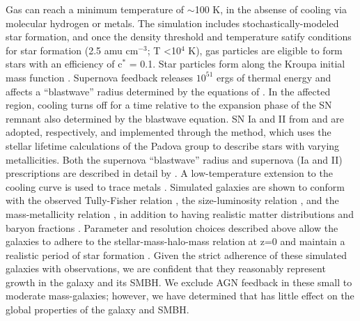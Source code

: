 \documentclass[12pt,headA,chapB]{fiskthesis}
\begin{document}
Gas can reach a minimum temperature of $\sim$100 K, in the absense of cooling via molecular hydrogen or metals. The simulation includes stochastically-modeled star formation, and once the density threshold and temperature satify conditions for star formation (2.5 amu cm$^{-3}$; T 
\textless 10$^4$ K), gas particles are eligible to form stars with an efficiency of c$^*$ = 0.1. Star particles form along the Kroupa initial mass function \citep{Kroupa2001}. Supernova feedback releases $10^{51}$ ergs of thermal energy and affects a ``blastwave'' radius determined by the equations of \cite{Ostriker1988}. In the affected region, cooling turns off for a time relative to the expansion phase of the SN remnant also determined by the blastwave equation. SN Ia and II from \cite{Thielemann1986} and \cite{Woosley1986} are adopted, respectively, and implemented through the \cite{Raiteri1996} method, which uses the stellar lifetime calculations of the Padova group \citep{Alongi1993, Bressan1993, Bertelli1994} to describe stars with varying metallicities. Both the supernova ``blastwave'' radius and supernova (Ia and II) prescriptions are described in detail by \cite{Stinson2006}. A low-temperature extension to the cooling curve is used to trace metals \citep{Bromm2001}. Simulated galaxies are shown to conform with the observed Tully-Fisher relation \citep{Governato2009}, the size-luminosity relation \citep{Brooks2011}, and the mass-metallicity relation \citep{Brooks2007}, in addition to having realistic matter distributions and baryon fractions \citep{Governato2009a,Guedes2011}. Parameter and resolution choices described above allow the galaxies to adhere to the stellar-mass-halo-mass relation at z=0 and maintain a realistic period of star formation \citep{Moster2010,Munshi2013,Brooks2007,Maiolino2008}. Given the strict adherence of these simulated galaxies with observations, we are confident that they reasonably represent growth in the galaxy and its SMBH. We exclude AGN feedback in these small to moderate mass-galaxies; however, we have determined that has little effect on the global properties of the galaxy and SMBH.
 
\end{document}
